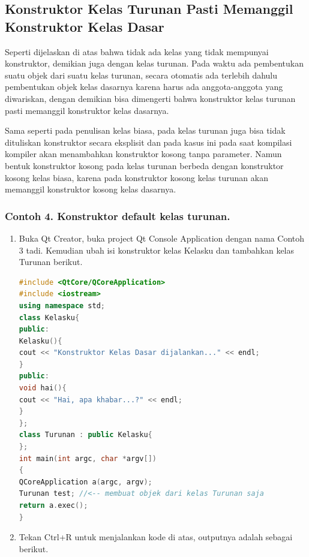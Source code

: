 \subsection{Konstruktor Kelas Turunan Pasti Memanggil Konstruktor
Kelas
Dasar}\label{konstruktor-kelas-turunan-pasti-memanggil-konstruktor-kelas-dasar}

Seperti dijelaskan di atas bahwa tidak ada kelas yang tidak mempunyai
konstruktor, demikian juga dengan kelas turunan. Pada waktu ada
pembentukan suatu objek dari suatu kelas turunan, secara otomatis ada
terlebih dahulu pembentukan objek kelas dasarnya karena harus ada
anggota-anggota yang diwariskan, dengan demikian bisa dimengerti bahwa
konstruktor kelas turunan pasti memanggil konstruktor kelas dasarnya.

Sama seperti pada penulisan kelas biasa, pada kelas turunan juga bisa
tidak dituliskan konstruktor secara eksplisit dan pada kasus ini pada
saat kompilasi kompiler akan menambahkan konstruktor kosong tanpa
parameter. Namun bentuk konstruktor kosong pada kelas turunan berbeda
dengan konstruktor kosong kelas biasa, karena pada konstruktor kosong
kelas turunan akan memanggil konstruktor kosong kelas dasarnya.

\subsubsection*{Contoh 4. Konstruktor default kelas turunan.}

\begin{enumerate}
\def\labelenumi{\arabic{enumi}.}
\item
  Buka Qt Creator, buka project Qt Console Application dengan nama
  Contoh 3 tadi. Kemudian ubah isi konstruktor kelas Kelasku dan
  tambahkan kelas Turunan berikut.

\begin{lstlisting}[language=c++]
#include <QtCore/QCoreApplication>
#include <iostream>
using namespace std;
class Kelasku{
public:
Kelasku(){
cout << "Konstruktor Kelas Dasar dijalankan..." << endl;
}
public:
void hai(){
cout << "Hai, apa khabar...?" << endl;
}
};
class Turunan : public Kelasku{
};
int main(int argc, char *argv[])
{
QCoreApplication a(argc, argv);
Turunan test; //<-- membuat objek dari kelas Turunan saja
return a.exec();
}
\end{lstlisting}
\item
  Tekan Ctrl+R untuk menjalankan kode di atas, outputnya adalah sebagai
  berikut.
\end{enumerate}

